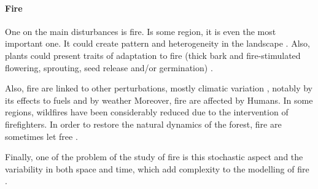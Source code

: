 \documentclass{article}
\begin{document}
\paragraph{Fire \\}

One on the main disturbances is fire. Is some region, it is even the most important one. It could create pattern and heterogeneity in the landscape \cite{skinner1996fire}. Also, plants could present traits of adaptation to fire (thick  bark  and  fire-stimulated  flowering,  sprouting,  seed
release and/or germination) \cite{mckelvey1996overview} \cite{chang1996ecosystem}.

Also, fire are linked to other perturbations, mostly climatic variation \cite{mckenzie_climatic_2004}\cite{da2018dynamics}, notably by its effects to fuels \cite{schoennagel_interaction_2004} and by weather \cite{fernandes_fire-smart_2013} 
Moreover, fire are affected by Humans. In some regions, wildfires have been considerably reduced due to the intervention of firefighters. In order to restore the natural dynamics of the forest, fire are sometimes let free \cite{wallenius2011major}. 

Finally, one of the problem of the study of fire is this stochastic aspect and the variability in both space and time, which add complexity to the modelling of fire  \cite{agee1998landscape} \cite{lertzman1998three}.





\end{document}

